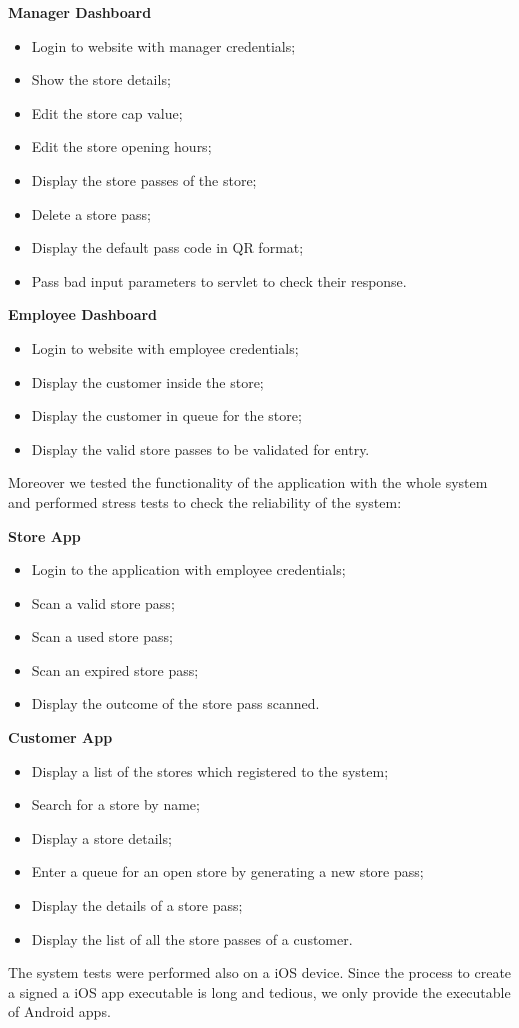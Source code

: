 \textbf{Manager Dashboard}
\begin{itemize}
	\item Login to website with manager credentials;
	\item Show the store details;
	\item Edit the store cap value;
	\item Edit the store opening hours;
	\item Display the store passes of the store;
	\item Delete a store pass;
	\item Display the default pass code in QR format;
	\item Pass bad input parameters to servlet to check their response.
\end{itemize}

\textbf{Employee Dashboard}
\begin{itemize}
	\item Login to website with employee credentials;
	\item Display the customer inside the store;
	\item Display the customer in queue for the store;
	\item Display the valid store passes to be validated for entry.
\end{itemize}
 
Moreover we tested the functionality of the application with the whole system and performed stress tests to check the reliability of the system:

\textbf{Store App}
\begin{itemize}
	\item Login to the application with employee credentials;
	\item Scan a valid store pass;
	\item Scan a used store pass;
	\item Scan an expired store pass;
	\item Display the outcome of the store pass scanned.
\end{itemize}

\textbf{Customer App}
\begin{itemize}
	\item Display a list of the stores which registered to the system;
	\item Search for a store by name;
	\item Display a store details;
	\item Enter a queue for an open store by generating a new store pass;
	\item Display the details of a store pass;
	\item Display the list of all the store passes of a customer.
\end{itemize}

The system tests were performed also on a iOS device.\newline
Since the process to create a signed a iOS app executable is long and tedious, we only provide the executable of Android apps.